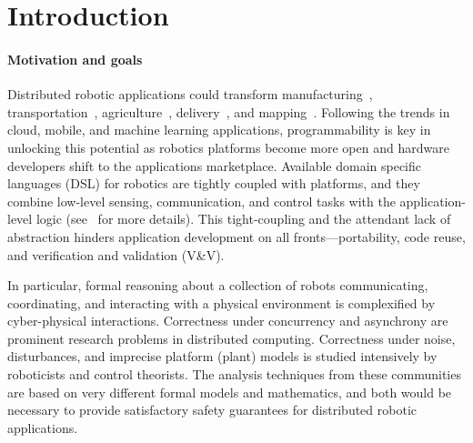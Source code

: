 \section{Introduction}
\label{sec:intro}

\paragraph{Motivation and goals}
Distributed robotic applications could transform manufacturing~\cite{pires2000object,gauthier1987interprocess}, transportation~\cite{gerla2014internet,guo2012autonomous}, agriculture~\cite{blender2016managing,r2018research}, delivery~\cite{mosterman2014heterogeneous}, and mapping~\cite{thrun2002robotic}.
Following the trends in cloud, mobile, and machine learning applications, programmability is key in unlocking this potential
as robotics platforms become more open and hardware developers shift to the applications marketplace.
Available domain specific languages (DSL) for robotics are tightly coupled with platforms,
and they combine low-level sensing, communication, and control tasks with the application-level logic
(see~ for more details).
This tight-coupling and the attendant lack of abstraction hinders application development on all fronts---portability, code reuse, and verification and validation (V\&V).

In particular, formal reasoning about a collection of robots communicating, coordinating, and interacting with a physical environment
is complexified by cyber-physical interactions.
Correctness under concurrency and asynchrony are prominent research problems in distributed computing. Correctness under noise, disturbances, and imprecise platform (plant) models is studied intensively by roboticists and control theorists. 
The analysis techniques from these communities are based on very different formal models and mathematics, and both would be necessary  to provide satisfactory safety guarantees for  distributed robotic applications.


